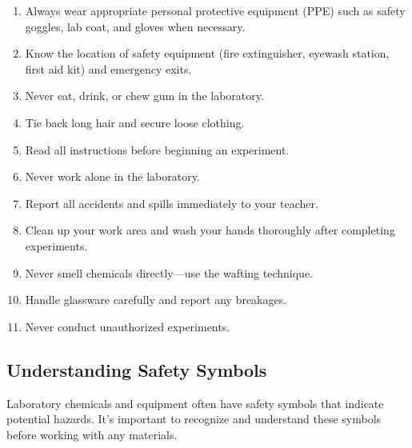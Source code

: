 \documentclass[justified,notoc]{tufte-book}
\newenvironment{keyconcept}[1]{%
    \begin{tcolorbox}[colback=primary!5,colframe=primary,title=\textbf{Key Concept: #1}]
}{%
    \end{tcolorbox}
}
\begin{document}
\begin{keyconcept}{Laboratory Safety Rules}
\begin{enumerate}
    \item Always wear appropriate personal protective equipment (PPE) such as safety goggles, lab coat, and gloves when necessary.
    
    \item Know the location of safety equipment (fire extinguisher, eyewash station, first aid kit) and emergency exits.
    
    \item Never eat, drink, or chew gum in the laboratory.
    
    \item Tie back long hair and secure loose clothing.
    
    \item Read all instructions before beginning an experiment.
    
    \item Never work alone in the laboratory.
    
    \item Report all accidents and spills immediately to your teacher.
    
    \item Clean up your work area and wash your hands thoroughly after completing experiments.
    
    \item Never smell chemicals directly—use the wafting technique.
    
    \item Handle glassware carefully and report any breakages.
    
    \item Never conduct unauthorized experiments.
\end{enumerate}
\end{keyconcept}

    \centering

\subsection{Understanding Safety Symbols}

Laboratory chemicals and equipment often have safety symbols that indicate potential hazards. It's important to recognize and understand these symbols before working with any materials.
\end{document}
